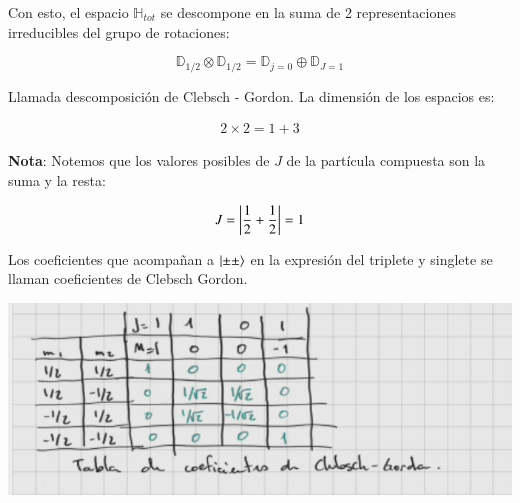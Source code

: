 Con esto, el espacio $\mathbb{H}_{tot}$ se descompone en la suma de 2 representaciones irreducibles del grupo de rotaciones:

$$\mathbb{D}_{1/2}\otimes\mathbb{D}_{1/2}=\mathbb{D}_{j=0}\oplus\mathbb{D}_{J=1}$$

Llamada descomposición de Clebsch - Gordon. La dimensión de los espacios es:

\begin{align*}
    2\times2=1+3
\end{align*}

\textbf{Nota}: Notemos que los valores posibles de $J$ de la partícula compuesta son la suma y la resta:

\begin{align*}
    J=\abs{\frac{1}{2}+\frac{1}{2}}=1
\end{align*}

Los coeficientes que acompañan a $\ket{\pm\pm}$ en la expresión del triplete y singlete se llaman coeficientes de Clebsch Gordon.


\includegraphics{Graficas/G1-Aug9.png}


